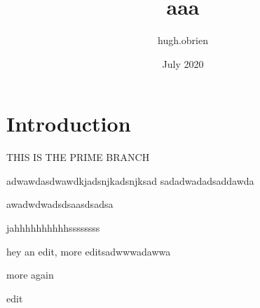 \documentclass{article}
\title{aaa}
\author{hugh.obrien }
\date{July 2020}
\begin{document}
\maketitle

\section{Introduction}

THIS IS THE PRIME BRANCH

adwawdasdwawdkjadsnjkadsnjksad
sadadwadadsaddawda

awadwdwadsdsaasdsadsa

jahhhhhhhhhhssssssss



hey an edit, more editsadwwwadawwa

more again

edit
\end{document}
